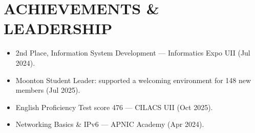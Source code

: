 \documentclass[a4paper,10pt]{article}
\begin{document}
\section*{ACHIEVEMENTS \& LEADERSHIP}
\begin{itemize}
  \item 2nd Place, Information System Development --- Informatics Expo UII (Jul 2024).
  \item Moonton Student Leader: supported a welcoming environment for 148 new members (Jul 2025).
  \item English Proficiency Test score 476 --- CILACS UII (Oct 2025).
  \item Networking Basics \& IPv6 --- APNIC Academy (Apr 2024).
\end{itemize}
\end{document}
